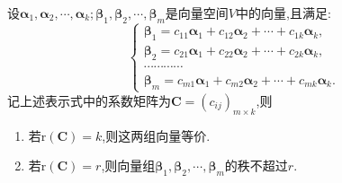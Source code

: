 \documentclass[../../main.tex]{subfiles}%
\begin{document}
\begin{proposition}\label{proposition:系数矩阵与向量组的秩}
设\(\boldsymbol{\alpha}_1,\boldsymbol{\alpha}_2,\cdots,\boldsymbol{\alpha}_k;\boldsymbol{\beta}_1,\boldsymbol{\beta}_2,\cdots,\boldsymbol{\beta}_m\)是向量空间\(V\)中的向量,且满足:
\[
\begin{cases}
\boldsymbol{\beta}_1 = c_{11}\boldsymbol{\alpha}_1 + c_{12}\boldsymbol{\alpha}_2+\cdots + c_{1k}\boldsymbol{\alpha}_k,\\
\boldsymbol{\beta}_2 = c_{21}\boldsymbol{\alpha}_1 + c_{22}\boldsymbol{\alpha}_2+\cdots + c_{2k}\boldsymbol{\alpha}_k,\\
\cdots\cdots\cdots\cdots\\
\boldsymbol{\beta}_m = c_{m1}\boldsymbol{\alpha}_1 + c_{m2}\boldsymbol{\alpha}_2+\cdots + c_{mk}\boldsymbol{\alpha}_k.
\end{cases}
\]
记上述表示式中的系数矩阵为\(\boldsymbol{C}=(c_{ij})_{m\times k}\),则
\begin{enumerate}[(1)]
\item 若\(\mathrm{r}(\boldsymbol{C}) = k\),则这两组向量等价.
\item 若\(\mathrm{r}(\boldsymbol{C}) = r\),则向量组\(\boldsymbol{\beta}_1,\boldsymbol{\beta}_2,\cdots,\boldsymbol{\beta}_m\)的秩不超过\(r\).
\end{enumerate}
\end{proposition}
\end{document}
